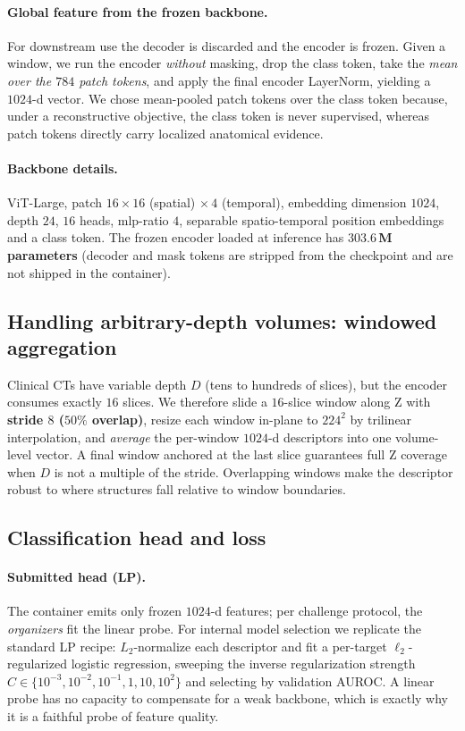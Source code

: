 \documentclass[runningheads]{llncs}
\begin{document}
\paragraph{Global feature from the frozen backbone.}
For downstream use the decoder is discarded and the encoder is frozen. Given a
window, we run the encoder \emph{without} masking, drop the class token, take the
\emph{mean over the $784$ patch tokens}, and apply the final encoder
LayerNorm, yielding a $1024$-d vector. We chose mean-pooled patch tokens over the
class token because, under a reconstructive objective, the class token is never
supervised, whereas patch tokens directly carry localized anatomical evidence.

\paragraph{Backbone details.}
ViT-Large, patch $16{\times}16$ (spatial) $\times\,4$ (temporal), embedding
dimension $1024$, depth $24$, $16$ heads, mlp-ratio $4$, separable
spatio-temporal position embeddings and a class token. The frozen encoder loaded
at inference has \textbf{$303.6$\,M parameters} (decoder and mask tokens are
stripped from the checkpoint and are not shipped in the container).

\subsection{Handling arbitrary-depth volumes: windowed aggregation}
\label{sec:agg}
Clinical CTs have variable depth $D$ (tens to hundreds of slices), but the
encoder consumes exactly $16$ slices. We therefore slide a $16$-slice window
along Z with \textbf{stride $8$ ($50\%$ overlap)}, resize each window in-plane to
$224^2$ by trilinear interpolation, and \emph{average} the per-window $1024$-d
descriptors into one volume-level vector. A final window anchored at the last
slice guarantees full Z coverage when $D$ is not a multiple of the stride.
Overlapping windows make the descriptor robust to where structures fall relative
to window boundaries.

\subsection{Classification head and loss}
\paragraph{Submitted head (LP).}
The container emits only frozen $1024$-d features; per challenge protocol, the
\emph{organizers} fit the linear probe. For internal model selection we
replicate the standard LP recipe: $L_2$-normalize each descriptor and fit a
per-target $\ell_2$-regularized logistic regression, sweeping the inverse
regularization strength $C\in\{10^{-3},10^{-2},10^{-1},1,10,10^{2}\}$ and
selecting by validation AUROC. A linear probe has no capacity to compensate for
a weak backbone, which is exactly why it is a faithful probe of feature quality.
\end{document}
